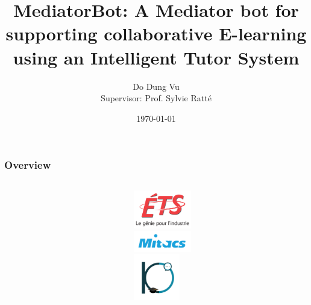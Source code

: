\documentclass{beamer}
\title[Laboratoire d'ingénierie cognitive et sémantique (LinCS)]{MediatorBot: A Mediator bot for supporting collaborative E-learning using an Intelligent Tutor System} %
\author{Do Dung Vu \\ Supervisor: Prof. Sylvie Ratt\'e} %
\institute[ETS] %
{
Département de génie logiciel et des TI \\ %
\medskip
\textit{do-dung.vu.1@ens.etsmtl.ca } %
}
\date{\today} %
\begin{document}
\begin{frame}
\titlepage %
\end{frame}

\begin{frame}
\frametitle{Overview} %
\begin{columns}
	\begin{column}{.65\textwidth}
\tableofcontents %
\end{column}
	\begin{column}{.35\textwidth}
					\includegraphics[width=25mm]{ETS.png}\\
										\includegraphics[width=25mm]{m2.jpg}\\
															\includegraphics[width=20mm]{000.png}
	\end{column}
\end{columns}
\end{frame}


\end{document}
